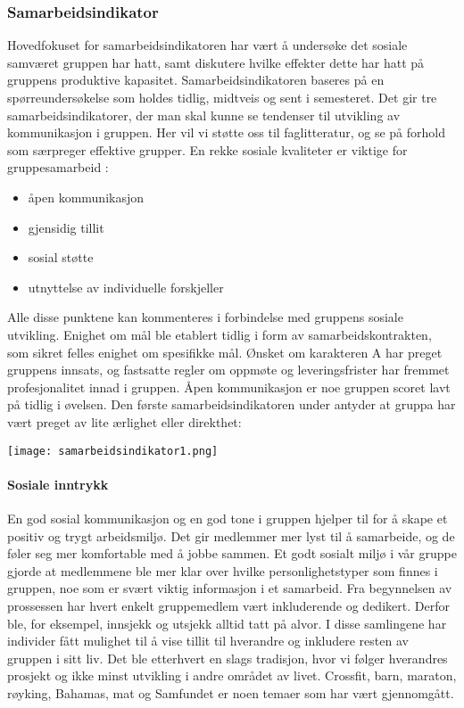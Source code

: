 \subsubsection{Samarbeidsindikator}

Hovedfokuset for samarbeidsindikatoren har vært å undersøke det sosiale samværet gruppen har hatt, samt diskutere hvilke effekter dette har hatt på gruppens produktive kapasitet.
Samarbeidsindikatoren baseres på en spørreundersøkelse som holdes tidlig, midtveis og sent i semesteret.
Det gir tre samarbeidsindikatorer, der man skal kunne se tendenser til utvikling av kommunikasjon i gruppen.
Her vil vi støtte oss til faglitteratur, og se på forhold som særpreger effektive grupper.
En rekke sosiale kvaliteter er viktige for gruppesamarbeid \cite{orgorg}:

\begin{itemize}
	\item åpen kommunikasjon
	\item gjensidig tillit
	\item sosial støtte
	\item utnyttelse av individuelle forskjeller
\end{itemize}
	
Alle disse punktene kan kommenteres i forbindelse med gruppens sosiale utvikling.
Enighet om mål ble etablert tidlig i form av samarbeidskontrakten, som sikret felles enighet om spesifikke mål.
Ønsket om karakteren A har preget gruppens innsats, og fastsatte regler om oppmøte og leveringsfrister har fremmet profesjonalitet innad i gruppen.
Åpen kommunikasjon er noe gruppen scoret lavt på tidlig i øvelsen.
Den første samarbeidsindikatoren under antyder at gruppa har vært preget av lite ærlighet eller direkthet:

\begin{center}
	\texttt{[image: samarbeidsindikator1.png]}
\end{center}

\paragraph{Sosiale inntrykk}

En god sosial kommunikasjon og en god tone i gruppen hjelper til for å skape et positiv og trygt arbeidsmiljø.
Det gir medlemmer mer lyst til å samarbeide, og de føler seg mer komfortable med å jobbe sammen.
Et godt sosialt miljø i vår gruppe gjorde at medlemmene ble mer klar over hvilke personlighetstyper som finnes i gruppen, noe som er svært viktig informasjon i et samarbeid.
Fra begynnelsen av prossessen har hvert enkelt gruppemedlem vært inkluderende og dedikert. 
Derfor ble, for eksempel, innsjekk og utsjekk alltid tatt på alvor.
I disse samlingene har individer fått mulighet til å vise tillit til hverandre og inkludere resten av gruppen i sitt liv. 
Det ble etterhvert en slags tradisjon, hvor vi følger hverandres prosjekt og ikke minst utvikling i andre området av livet.
Crossfit, barn, maraton, røyking, Bahamas, mat og Samfundet er noen temaer som har vært gjennomgått.

